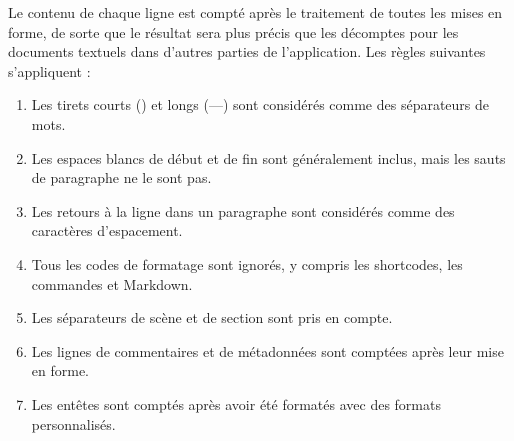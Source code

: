 \documentclass[a4paper,11pt,french]{sphinxmanual}
\begin{document}
\sphinxAtStartPar
Le contenu de chaque ligne est compté après le traitement de toutes les mises en forme, de sorte que le résultat sera plus précis que les décomptes pour les documents textuels dans d’autres parties de l’application. Les règles suivantes s’appliquent :
\begin{enumerate}
%
\item {} 
\sphinxAtStartPar
Les tirets courts (\sphinxhyphen{}) et longs (—) sont considérés comme des séparateurs de mots.

\item {} 
\sphinxAtStartPar
Les espaces blancs de début et de fin sont généralement inclus, mais les sauts de paragraphe ne le sont pas.

\item {} 
\sphinxAtStartPar
Les retours à la ligne dans un paragraphe sont considérés comme des caractères d’espacement.

\item {} 
\sphinxAtStartPar
Tous les codes de formatage sont ignorés, y compris les shortcodes, les commandes et Markdown.

\item {} 
\sphinxAtStartPar
Les séparateurs de scène et de section sont pris en compte.

\item {} 
\sphinxAtStartPar
Les lignes de commentaires et de métadonnées sont comptées après leur mise en forme.

\item {} 
\sphinxAtStartPar
Les en\sphinxhyphen{}têtes sont comptés après avoir été formatés avec des formats personnalisés.

\end{enumerate}
\end{document}
